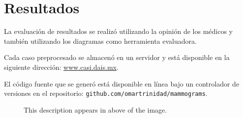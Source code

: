 \chapter{Resultados}

La evaluación de resultados se realizó utilizando la opinión de los médicos y 
también utilizando los diagramas como herramienta evaluadora.

Cada caso preprocesado se almacenó en un servidor y está disponible en la siguiente
dirección: \url{www.casi.dais.mx}.

El código fuente que se generó está disponible en línea bajo un controlador de
versiones en el repositorio: \texttt{github.com/omartrinidad/mammograms}.

\begin{figure}[h!]
  \begin{center}
    \hspace{\fill}
    \hfill
    \hspace{\fill}
  \caption[Compressed 8-bits mammogram and histogram]{This description appears 
  in above of the image.}
  \end{center}
  \label{8bits} 
\end{figure}


